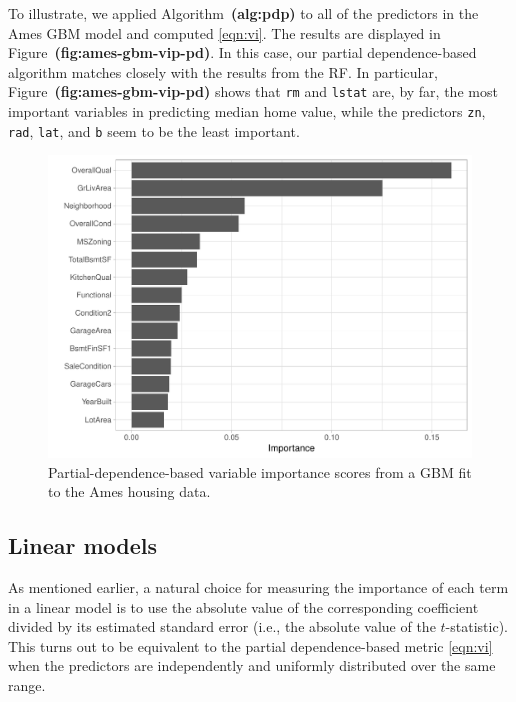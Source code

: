 \documentclass[12pt]{article}
\def\code#1{\texttt{#1}}
\def\ref#1{\textbf{(#1)}}
\begin{document}
To illustrate, we applied Algorithm~\ref{alg:pdp} to all of the predictors in the Ames GBM model and computed \eqref{eqn:vi}. The results are displayed in Figure~\ref{fig:ames-gbm-vip-pd}. In this case, our partial dependence-based algorithm matches closely with the results from the RF. In particular, Figure~\ref{fig:ames-gbm-vip-pd} shows that \code{rm} and \code{lstat} are, by far, the most important variables in predicting median home value, while the predictors \code{zn}, \code{rad}, \code{lat}, and \code{b} seem to be the least important.

\begin{figure}[!htb]
  \centering
  \includegraphics[width=1.0\textwidth]{ames-gbm-vip-pd}
  \caption{Partial-dependence-based variable importance scores from a GBM fit to the Ames housing data. \label{fig:ames-gbm-vip-pd}}
\end{figure}


\subsection{Linear models}
\label{sec:linear}

As mentioned earlier, a natural choice for measuring the importance of each term in a linear model is to use the absolute value of the corresponding coefficient divided by its estimated standard error (i.e., the absolute value of the $t$-statistic). This turns out to be equivalent to the partial dependence-based metric \eqref{eqn:vi} when the predictors are independently and uniformly distributed over the same range.
\end{document}
